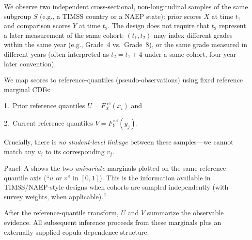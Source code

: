 \documentclass[10pt]{article}
\begin{document}
\noindent
\begin{minipage}[t]{3.75in}
  \vspace{0.05in}
  \hspace{0.15in}%
  \begin{minipage}{3.45in}
    \small\raggedright\color{bodyGrey}

    We observe two independent cross-sectional, non-longitudinal samples of the same subgroup 
    $S$ (e.g., a TIMSS country or a NAEP state): prior scores $X$ at time $t_1$ 
    and comparison scores $Y$ at time $t_2$. The design does not require that 
    $t_2$ represent a later measurement of the same cohort: $(t_1,t_2)$ may index 
    different grades within the same year (e.g., Grade~4 vs.\ Grade~8), or the same 
    grade measured in different years (often interpreted as $t_2=t_1+4$ under a 
    same-cohort, four-year-later convention).

    \vspace{4pt}
    We map scores to reference-quantiles (pseudo-observations) using fixed reference marginal CDFs:

    \vspace{4pt}
    \hspace{5pt}1.~Prior reference quantiles $U = F_X^{\mathrm{ref}}(x_i)$ and

    \vspace{1pt}
    \hspace{5pt}2.~Current reference quantiles $V = F_Y^{\mathrm{ref}}(y_j)$.

    \vspace{4pt}
    Crucially, there is \emph{no student-level linkage} between these 
    samples---we cannot match any $u_i$ to its corresponding $v_j$.

    \vspace{4pt}
    Panel~A shows the two \emph{univariate} marginals plotted on the same 
    reference-quantile axis (``$u$ or $v$'' in $[0,1]$). This is the 
    information available in TIMSS/NAEP-style designs when cohorts are 
    sampled independently (with survey weights, when applicable).$^{\mbox{\footnotesize{1}}}$
    
    \vspace{4pt}
    After the reference-quantile transform, $U$ and $V$ summarize the observable evidence.
    All subsequent inference proceeds from these marginals plus an externally supplied
    copula dependence structure.

  \end{minipage}
  \vspace{0.1in}
\end{minipage}
\end{document}
